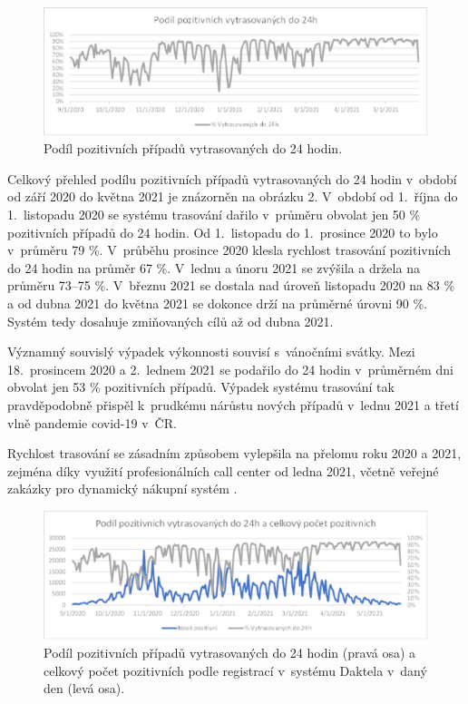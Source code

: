 \begin{figure}[ht]
    \centering
    \includegraphics[width=1\textwidth]{./pic/a.eps}
    \caption{Podíl pozitivních případů vytrasovaných do 24 hodin.}
    \label{fig:pozitivni24}
\end{figure}

Celkový přehled podílu pozitivních případů vytrasovaných do 24 hodin v~období od září 2020 do května 2021 je znázorněn na obrázku 2. V~období od 1.~října do 1.~listopadu 2020 se systému trasování dařilo v~průměru obvolat jen 50 \% pozitivních případů do 24 hodin. Od 1.~listopadu do 1.~prosince 2020 to bylo v~průměru 79 \%. V~průběhu prosince 2020 klesla rychlost trasování pozitivních do 24 hodin na průměr 67 \%. V~lednu a únoru 2021 se zvýšila a držela na průměru 73--75 \%. V~březnu 2021 se dostala nad úroveň listopadu 2020 na 83 \% a od dubna 2021 do května 2021 se dokonce drží na průměrné úrovni 90 \%. Systém tedy dosahuje zmiňovaných cílů až od dubna 2021.

Významný souvislý výpadek výkonnosti souvisí s~vánočními svátky. Mezi 18.~prosincem 2020 a 2.~lednem 2021 se podařilo do 24 hodin v~průměrném dni obvolat jen 53 \% pozitivních případů. Výpadek systému trasování tak pravděpodobně přispěl k~prudkému nárůstu nových případů v~lednu 2021 a třetí vlně pandemie covid-19 v~ČR.

Rychlost trasování se zásadním způsobem vylepšila na přelomu roku 2020 a 2021, zejména díky využití profesionálních call center od ledna 2021, včetně veřejné zakázky pro dynamický nákupní systém \cite{tr_hlidac01}.

\begin{figure}[ht]
    \centering
    \includegraphics[width=1\textwidth]{./pic/b.eps}
    \caption{Podíl pozitivních případů vytrasovaných do 24 hodin (pravá osa) a celkový počet pozitivních podle registrací v~systému Daktela v~daný den (levá osa).}
    \label{fig:pozitivni24_2}
\end{figure}

